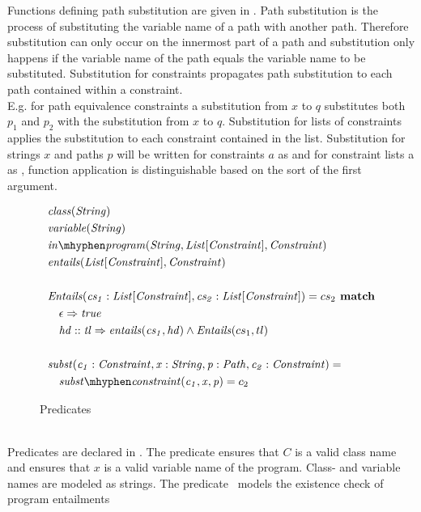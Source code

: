 Functions defining path substitution are given in .
Path substitution is the process of substituting the variable name of a path
with another path.
Therefore substitution can only occur on the innermost part of a path and
substitution only happens if the variable name of the path equals the variable name to be substituted.
Substitution for constraints propagates path substitution to each path contained within a constraint.\\
E.g. for path equivalence constraints  a substitution from $x$ to $q$
substitutes both $p_1$ and $p_2$ with the substitution from $x$ to $q$.
Substitution for lists of constraints applies the substitution
to each constraint contained in the list.
Substitution for strings $x$ and paths $p$ will be written
for constraints $a$ as  and
for constraint lists \ovl a as ,
function application is distinguishable based on the sort of the first argument.
\begin{figure}[h]
\centering
\begin{align*}
&\mathit{class}(\mathit{String}) \\
&\mathit{variable}(\mathit{String})\\
&\inprog(\mathit{String},\mathit{List[Constraint]}, \mathit{Constraint}) \\
&\mathit{entails}(\mathit{List[Constraint]}, \mathit{Constraint})\\\\
&\mathit{Entails(cs_1: List[Constraint], cs_2: List[Constraint])} = cs_2 \match\\
&\quad \case{\epsilon}{true}\\
&\quad \case{hd :: tl}{\mIt{entails}(cs_1, hd)} \land \mIt{Entails}(cs_1, tl)\\\\
&\mathit{subst(c_1: Constraint, x: String, p: Path, c_2: Constraint)} = \\
&\quad\substconstr{c_1}{x}{p} = c_2
\end{align*}
\caption{Predicates}
\label{subfig:axioms-naive-general-predicates}
\end{figure}\\
Predicates are declared in .
The predicate  ensures that $C$ is a valid class name
and  ensures that $x$ is a valid variable name
of the program.
Class- and variable names are modeled as strings.
The predicate \inprog\ models the existence check of program entailments
